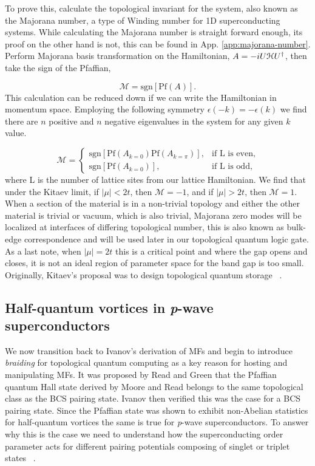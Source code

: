 To prove this, calculate the topological invariant for the system, also known as the Majorana number, a type of Winding number for 1D superconducting systems.
While calculating the Majorana number is straight forward enough, its proof on the other hand is not, this can be found in App. \ref{app:majorana-number}.
Perform Majorana basis transformation on the Hamiltonian, $A = -iU \mathcal{H} U^{\dagger}$, then take the sign of the Pfaffian,

\begin{equation}
  \mathcal{M} = \text{sgn} [\text{Pf} (A)].
\end{equation}
This calculation can be reduced down if we can write the Hamiltonian in momentum space.
Employing the following symmetry $\epsilon(-k) = -\epsilon(k)$ we find there are $n$ positive and $n$ negative eigenvalues in the system for any given $k$ value.

\begin{equation}
  \mathcal{M} =
  \begin{cases}
    \text{sgn} [\text{Pf} (A_{k=0}) \text{Pf} (A_{k=\pi})], &\text{if L is even}, \\
    \text{sgn} [\text{Pf} (A_{k=0})], &\text{if L is odd},
  \end{cases}
\end{equation}
where L is the number of lattice sites from our lattice Hamiltonian.
We find that under the Kitaev limit, if $|\mu|< 2t$, then $\mathcal{M} = -1$, and if $|\mu| > 2t$, then $\mathcal{M} = 1$.
When a section of the material is in a non-trivial topology and either the other material is trivial or vacuum, which is also trivial, Majorana zero modes will be localized at interfaces of differing topological number, this is also known as bulk-edge correspondence and will be used later in our topological quantum logic gate.
As a last note, when $|\mu| = 2t$ this is a critical point and where the gap opens and closes, it is not an ideal region of parameter space for the band gap is too small.
Originally, Kitaev's proposal was to design topological quantum storage ~\cite{kitaevUnpairedMajoranaFermions2001}.
\subsection{Half-quantum vortices in \textit{p}-wave superconductors}
We now transition back to Ivanov's derivation of MFs and begin to introduce \textit{braiding} for topological quantum computing as a key reason for hosting and manipulating MFs.
It was proposed by Read and Green that the Pfaffian quantum Hall state derived by Moore and Read belongs to the same topological class as the BCS pairing state.
Ivanov then verified this was the case for a BCS pairing state.
Since the Pfaffian state was shown to exhibit non-Abelian statistics for half-quantum vortices the same is true for \textit{p}-wave superconductors.
To answer why this is the case we need to understand how the superconducting order parameter acts for different pairing potentials composing of singlet or triplet states ~\cite{ivanovNonAbelianStatisticsHalfQuantum2001}.

